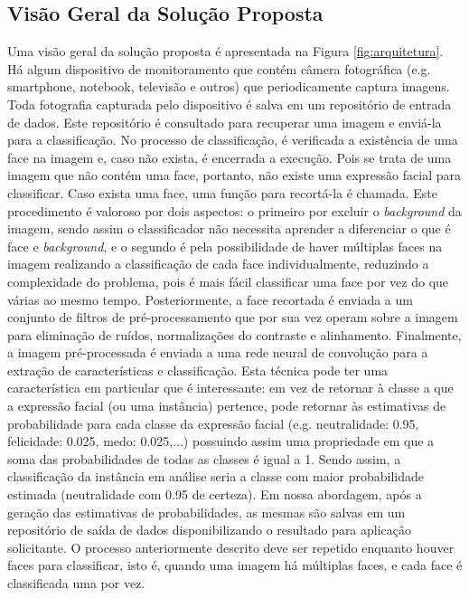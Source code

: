 \subsection{Visão Geral da Solução Proposta}
Uma visão geral da solução proposta é apresentada na Figura \ref{fig:arquitetura}. Há algum dispositivo de monitoramento que contém câmera fotográfica (e.g. smartphone, notebook, televisão e outros) que periodicamente captura imagens. Toda fotografia capturada pelo dispositivo é salva em um repositório de entrada de dados. Este repositório é consultado para recuperar uma imagem e enviá-la para a classificação. No processo de classificação, é verificada a existência de uma face na imagem e, caso não exista, é encerrada a execução. Pois se trata de uma imagem que não contém uma face, portanto, não existe uma expressão facial para classificar. Caso exista uma face, uma função para recortá-la é chamada. Este procedimento é valoroso por dois aspectos: o primeiro por excluir o \textit{background} da imagem, sendo assim o classificador não necessita aprender a diferenciar o que é face e \textit{background}, e o segundo é pela possibilidade de haver múltiplas faces na imagem realizando a classificação de cada face individualmente, reduzindo a complexidade do problema, pois é mais fácil classificar uma face por vez do que várias ao mesmo tempo. Posteriormente, a face recortada é enviada a um conjunto de filtros de pré-processamento que por sua vez operam sobre a imagem para eliminação de ruídos, normalizações do contraste e alinhamento. Finalmente, a imagem pré-processada é enviada a uma rede neural de convolução para a extração de características e classificação. Esta técnica pode ter uma característica em particular que é interessante: em vez de retornar à classe a que a expressão facial (ou uma instância) pertence, pode retornar às estimativas de probabilidade para cada classe da expressão facial (e.g. neutralidade: 0.95, felicidade: 0.025, medo: 0.025,...) possuindo assim uma propriedade em que a soma das probabilidades de todas as classes é igual a 1. Sendo assim, a classificação da instância em análise seria a classe com maior probabilidade estimada (neutralidade com 0.95 de certeza). Em nossa abordagem, após a geração das estimativas de probabilidades, as mesmas são salvas em um repositório de saída de dados disponibilizando o resultado para aplicação solicitante. O processo anteriormente descrito deve ser repetido enquanto houver faces para classificar, isto é, quando uma imagem há múltiplas faces, e cada face é classificada uma por vez.

